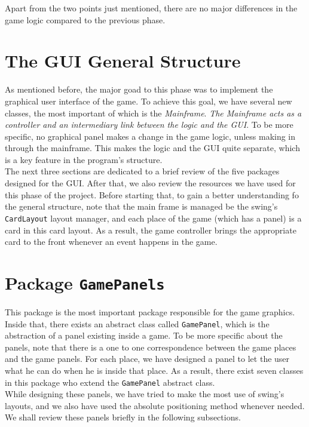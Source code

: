 \documentclass[a4paper]{article}
\begin{document}
Apart from the two points just mentioned, there are no major differences in the game logic compared to the previous phase.

\clearpage
\section{The GUI General Structure}
As mentioned before, the major goad to this phase was to implement the graphical user interface of the game. To achieve this goal, we have several new classes, the most important of which is the \textit{Mainframe}. \textit{The Mainframe acts as a controller and an intermediary link between the logic and the GUI}. To be more specific, no graphical panel makes a change in the game logic, unless making in through the mainframe. This makes the logic and the GUI quite separate, which is a key feature in the program's structure.\\

The next three sections are dedicated to a brief review of the five packages designed for the GUI. After that, we also review the resources we have used for this phase of the project. Before starting that, to gain a better understanding fo the general structure, note that the main frame is managed be the swing's \texttt{CardLayout} layout manager, and each place of the game (which has a panel) is a card in this card layout. As a result, the game controller brings the appropriate card to the front whenever an event happens in the game.


\clearpage
\section{Package \texttt{GamePanels}}
This package is the most important package responsible for the game graphics. Inside that, there exists an abstract class called \texttt{GamePanel}, which is the abstraction of a panel existing inside a game. To be more specific about the panels, note that there is a one to one correspondence between the game places and the game panels. For each place, we have designed a panel to let the user what he can do when he is inside that place. As a result, there exist seven classes in this package who extend the \texttt{GamePanel} abstract class.\\

While designing these panels, we have tried to make the most use of swing's layouts, and we also have used the absolute positioning method whenever needed. We shall review these panels briefly in the following subsections.
\end{document}
